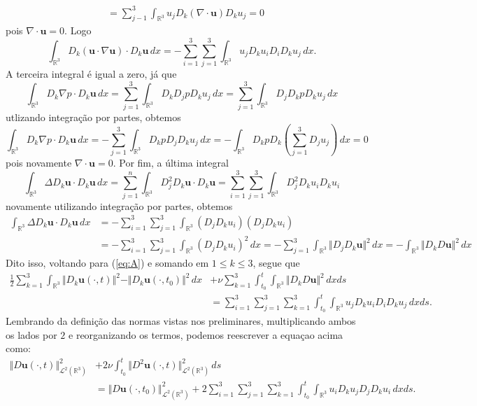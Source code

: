 \documentclass[a4paper, 11pt]{book}
\theoremstyle{definition}
\newcommand{\bR}{\mathbb{R}}
\newcommand{\bu}{\mathbf{u}}
\newcommand{\cL}{\mathcal{L}}
\begin{document}
\begin{prf}
\[\begin{aligned}
            &= \sum_{j-1}^3 \int_{\bR^3} u_j D_k (\nabla \cdot \bu) D_k u_j = 0
        \end{aligned}
    \]
    pois $\nabla \cdot \bu = 0$. Logo
    \[
        \int_{\bR^3} D_k ( \bu \cdot \nabla \bu) \cdot D_k \bu \,dx = -\sum_{i=1}^3 \sum_{j=1}^3 \int_{\bR^3} u_j D_k u_i D_i D_k u_j \,dx.
    \]
    A terceira integral é igual a zero, já que
    \[
        \int_{\bR^3} D_k \nabla p \cdot D_k \bu \,dx = \sum_{j=1}^{3} \int_{\bR^3} D_k D_j p D_k u_j \,dx = \sum_{j=1}^3 \int_{\bR^3} D_j D_k p D_k u_j \,dx
    \]
    utlizando integração por partes, obtemos
    \[
        \int_{\bR^3} D_k \nabla p \cdot D_k \bu \,dx = -\sum_{j=1}^3 \int_{\bR^3} D_k p D_j D_k  u_j \,dx = - \int_{\bR^3} D_k p D_k \left( \sum_{j=1}^3 D_j u_j \right) \,dx = 0
    \]
    pois novamente $\nabla \cdot \bu = 0$.
    Por fim, a última integral
    \[
        \int_{\bR^3} \Delta D_k \bu \cdot D_k \bu \,dx =  \sum_{j=1}^n \int_{\bR^3} D_j^2 D_k \bu \cdot D_k\bu = \sum_{i=1}^3 \sum_{j=1}^3 \int_{\bR^3} D_j^2 D_k u_i D_k u_i 
    \]
    novamente utilizando integração por partes, obtemos
    \[
        \begin{aligned}
            \int_{\bR^3} \Delta D_k \bu \cdot D_k \bu \,dx &= -\sum_{i=1}^3 \sum_{j=1}^3 \int_{\bR^3} (D_jD_k u_i)(D_jD_k u_i)\\ 
            &= -\sum_{i=1}^3 \sum_{j=1}^3  \int_{\bR^3} (D_j D_k u_i)^2 \,dx = -\!\sum_{j=1}^3  \int_{\bR^3} \Vert D_jD_k \bu \Vert^2 \,dx = -\!\!\int_{\bR^3} \Vert D_kD\bu \Vert^2 \,dx
        \end{aligned}
    \]
    Dito isso, voltando para (\ref{eq:A}) e somando em $1 \leqslant k \leqslant 3$, segue que
    \[
        \begin{aligned}
            \frac{1}{2} \sum_{k=1}^3 \int_{\bR^3} \Vert D_k \bu(\cdot,t) \Vert^2 - \Vert D_k \bu(\cdot,t_0) \Vert^2 \,dx  &+ \nu \sum_{k=1}^3 \int_{t_0}^t \int_{\bR^3} \Vert D_kD\bu \Vert^2 \,dx ds\\
        &= \sum_{i=1}^3 \sum_{j=1}^3\sum_{k=1}^3 \int_{t_0}^{t}\int_{\bR^3} u_j D_k u_i D_i D_k u_j \,dxds.
        \end{aligned}
    \]
    Lembrando da definição das normas vistas nos preliminares, multiplicando ambos os lados por $2$ e reorganizando os termos, podemos reescrever a equaçao acima como:
    \[
        \begin{aligned}
            \Vert D\bu(\cdot,t) \Vert_{\cL^2(\bR^3)}^2 &+ 2\nu \int_{t_0}^t \Vert D^2 \bu(\cdot,t) \Vert_{\cL^2(\bR^3)}^2 \,ds\\ &= \Vert D\bu(\cdot,t_0) \Vert_{\cL^2(\bR^3)}^2 + 2 \sum_{i=1}^3 \sum_{j=1}^3\sum_{k=1}^3 \int_{t_0}^t \int_{\bR^3} u_i D_k u_j D_j D_k u_i \,dxds.

\end{aligned}\]
\end{prf}
\end{document}
